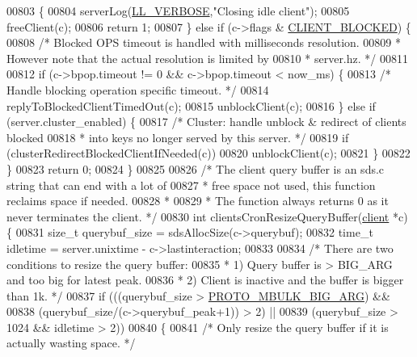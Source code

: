 \begin{DoxyCode}
{{{{{00803     \{
00804         serverLog(\hyperlink{server_8h_a479b60032f8da6d8ad72e1a9d0809950}{LL\_VERBOSE},\textcolor{stringliteral}{"Closing idle client"});
00805         freeClient(c);
00806         \textcolor{keywordflow}{return} 1;
00807     \} \textcolor{keywordflow}{else} \textcolor{keywordflow}{if} (c->flags & \hyperlink{server_8h_a503ad979164a52f0f5e2a63e4c7da3a0}{CLIENT\_BLOCKED}) \{
00808         \textcolor{comment}{/* Blocked OPS timeout is handled with milliseconds resolution.}
00809 \textcolor{comment}{         * However note that the actual resolution is limited by}
00810 \textcolor{comment}{         * server.hz. */}
00811 
00812         \textcolor{keywordflow}{if} (c->bpop.timeout != 0 && c->bpop.timeout < now\_ms) \{
00813             \textcolor{comment}{/* Handle blocking operation specific timeout. */}
00814             replyToBlockedClientTimedOut(c);
00815             unblockClient(c);
00816         \} \textcolor{keywordflow}{else} \textcolor{keywordflow}{if} (server.cluster\_enabled) \{
00817             \textcolor{comment}{/* Cluster: handle unblock & redirect of clients blocked}
00818 \textcolor{comment}{             * into keys no longer served by this server. */}
00819             \textcolor{keywordflow}{if} (clusterRedirectBlockedClientIfNeeded(c))
00820                 unblockClient(c);
00821         \}
00822     \}
00823     \textcolor{keywordflow}{return} 0;
00824 \}
00825 
00826 \textcolor{comment}{/* The client query buffer is an sds.c string that can end with a lot of}
00827 \textcolor{comment}{ * free space not used, this function reclaims space if needed.}
00828 \textcolor{comment}{ *}
00829 \textcolor{comment}{ * The function always returns 0 as it never terminates the client. */}
00830 \textcolor{keywordtype}{int} clientsCronResizeQueryBuffer(\hyperlink{structclient}{client} *c) \{
00831     size\_t querybuf\_size = sdsAllocSize(c->querybuf);
00832     time\_t idletime = server.unixtime - c->lastinteraction;
00833 
00834     \textcolor{comment}{/* There are two conditions to resize the query buffer:}
00835 \textcolor{comment}{     * 1) Query buffer is > BIG\_ARG and too big for latest peak.}
00836 \textcolor{comment}{     * 2) Client is inactive and the buffer is bigger than 1k. */}
00837     \textcolor{keywordflow}{if} (((querybuf\_size > \hyperlink{server_8h_afb6bccf6f1ac66b1d563330ab499fb32}{PROTO\_MBULK\_BIG\_ARG}) &&
00838          (querybuf\_size/(c->querybuf\_peak+1)) > 2) ||
00839          (querybuf\_size > 1024 && idletime > 2))
00840     \{
00841         \textcolor{comment}{/* Only resize the query buffer if it is actually wasting space. */}
}}}}}
\end{DoxyCode}
